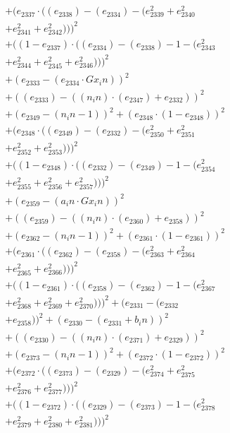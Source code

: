 \documentclass[10pt, a4paper]{article}
\begin{document}
\begin{align*}
& + (e_{2337}  \cdot  ((e_{2338}) - (e_{2334}) - (e_{2339}^{2} + e_{2340}^{2} \\
& + e_{2341}^{2} + e_{2342}^{2})))^{2} \\
& + ((1 - e_{2337})  \cdot  ((e_{2334}) - (e_{2338}) - 1 - (e_{2343}^{2} \\
& + e_{2344}^{2} + e_{2345}^{2} + e_{2346}^{2})))^{2} \\
& + (e_{2333} - (e_{2334}  \cdot  Gx_in))^{2} \\
& + ((e_{2333}) - ((n_in)  \cdot  (e_{2347}) + e_{2332}))^{2} \\
& + (e_{2349} - (n_in - 1))^{2} + (e_{2348}  \cdot  (1 - e_{2348}))^{2} \\
& + (e_{2348}  \cdot  ((e_{2349}) - (e_{2332}) - (e_{2350}^{2} + e_{2351}^{2} \\
& + e_{2352}^{2} + e_{2353}^{2})))^{2} \\
& + ((1 - e_{2348})  \cdot  ((e_{2332}) - (e_{2349}) - 1 - (e_{2354}^{2} \\
& + e_{2355}^{2} + e_{2356}^{2} + e_{2357}^{2})))^{2} \\
& + (e_{2359} - (a_in  \cdot  Gx_in))^{2} \\
& + ((e_{2359}) - ((n_in)  \cdot  (e_{2360}) + e_{2358}))^{2} \\
& + (e_{2362} - (n_in - 1))^{2} + (e_{2361}  \cdot  (1 - e_{2361}))^{2} \\
& + (e_{2361}  \cdot  ((e_{2362}) - (e_{2358}) - (e_{2363}^{2} + e_{2364}^{2} \\
& + e_{2365}^{2} + e_{2366}^{2})))^{2} \\
& + ((1 - e_{2361})  \cdot  ((e_{2358}) - (e_{2362}) - 1 - (e_{2367}^{2} \\
& + e_{2368}^{2} + e_{2369}^{2} + e_{2370}^{2})))^{2} + (e_{2331} - (e_{2332} \\
& + e_{2358}))^{2} + (e_{2330} - (e_{2331} + b_in))^{2} \\
& + ((e_{2330}) - ((n_in)  \cdot  (e_{2371}) + e_{2329}))^{2} \\
& + (e_{2373} - (n_in - 1))^{2} + (e_{2372}  \cdot  (1 - e_{2372}))^{2} \\
& + (e_{2372}  \cdot  ((e_{2373}) - (e_{2329}) - (e_{2374}^{2} + e_{2375}^{2} \\
& + e_{2376}^{2} + e_{2377}^{2})))^{2} \\
& + ((1 - e_{2372})  \cdot  ((e_{2329}) - (e_{2373}) - 1 - (e_{2378}^{2} \\
& + e_{2379}^{2} + e_{2380}^{2} + e_{2381}^{2})))^{2} \\

\end{align*}
\end{document}

